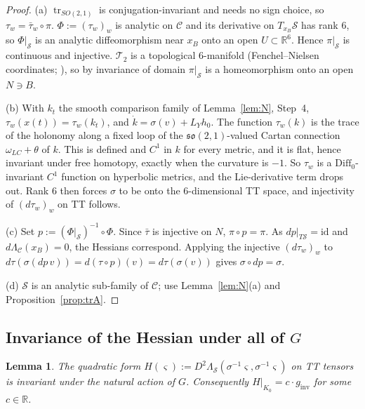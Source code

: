 \documentclass[11pt]{amsart}
\newtheorem{lemma}[theorem]{Lemma}
\theoremstyle{definition}
\theoremstyle{remark}
\newcommand{\R}{\mathbb{R}}
\newcommand{\Teich}{\mathcal{T}_2}
\newcommand{\Oct}{\mathcal{C}}
\newcommand{\Sl}{\mathcal{S}}
\newcommand{\tr}{\operatorname{tr}}
\newcommand{\gin}{g_{\mathrm{inv}}}
\newcommand{\xB}{x_B}
\begin{document}
\begin{proof}
(a) $\tr_{SO(2,1)}$ is conjugation-invariant and needs no sign choice, so $\tau_w=\bar\tau_w\circ\pi$.
$\Phi:=(\tau_w)_w$ is analytic on $\Oct$ and its derivative on $T_{\xB}\Sl$ has rank $6$, so
$\Phi|_\Sl$ is an analytic diffeomorphism near $\xB$ onto an open $U\subset\R^6$. Hence $\pi|_\Sl$ is
continuous and injective. $\Teich$ is a topological $6$-manifold (Fenchel--Nielsen coordinates;
\cite[\S2]{FN}), so by invariance of domain $\pi|_\Sl$ is a homeomorphism onto an open $N\ni B$.

(b) With $k_t$ the smooth comparison family of Lemma~\ref{lem:N}, Step~4,
$\tau_w(x(t))=\tau_w(k_t)$, and $\dot k=\sigma(v)+L_Yh_0$. The function $\tau_w(k)$ is the trace of
the holonomy along a fixed loop of the $\mathfrak{so}(2,1)$-valued Cartan connection
$\omega_{LC}+\theta$ of $k$. This is defined and $C^1$ in $k$ for every metric, and it is flat, hence
invariant under free homotopy, exactly when the curvature is $-1$. So $\tau_w$ is a
$\mathrm{Diff}_0$-invariant $C^1$ function on hyperbolic metrics, and the Lie-derivative term
drops out. Rank $6$ then forces $\sigma$ to be onto the $6$-dimensional TT space, and injectivity
of $(d\tau_w)_w$ on TT follows.

(c) Set $p:=(\Phi|_\Sl)^{-1}\circ\Phi$. Since $\bar\tau$ is injective on $N$, $\pi\circ p=\pi$. As
$dp|_{T\Sl}=\mathrm{id}$ and $d\Lambda_\Oct(\xB)=0$, the Hessians correspond. Applying the injective
$(d\tau_w)_w$ to $d\tau(\sigma(dp\,v))=d(\tau\circ p)(v)=d\tau(\sigma(v))$ gives $\sigma\circ dp=\sigma$.

(d) $\Sl$ is an analytic sub-family of $\Oct$; use Lemma~\ref{lem:N}(a) and
Proposition~\ref{prop:trA}.
\end{proof}

\subsection{Invariance of the Hessian under all of $G$}

\begin{lemma}\label{lem:Ginv}
The quadratic form $H(\varsigma):=D^2\Lambda_\Sl(\sigma^{-1}\varsigma,\sigma^{-1}\varsigma)$ on TT tensors is
invariant under the natural action of $G$. Consequently $H|_{K_0}=c\cdot\gin$ for some $c\in\R$.
\end{lemma}
\end{document}
